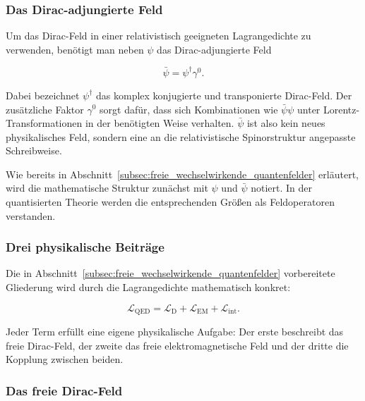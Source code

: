 \subsubsection*{Das Dirac-adjungierte Feld}

Um das Dirac-Feld in einer relativistisch geeigneten Lagrangedichte zu
verwenden, benötigt man neben \(\psi\) das
Dirac-adjungierte Feld

\begin{equation}
	\bar{\psi}
	=
	\psi^\dagger\gamma^0.
	\label{eq:dirac_adjunktion_qed}
\end{equation}

Dabei bezeichnet \(\psi^\dagger\) das komplex konjugierte und
transponierte Dirac-Feld. Der zusätzliche Faktor \(\gamma^0\) sorgt
dafür, dass sich Kombinationen wie \(\bar{\psi}\psi\) unter
Lorentz-Transformationen in der benötigten Weise verhalten.
\(\bar{\psi}\) ist also kein neues physikalisches Feld, sondern eine an
die relativistische Spinorstruktur angepasste Schreibweise.

Wie bereits in Abschnitt~\ref{subsec:freie_wechselwirkende_quantenfelder}
erläutert, wird die mathematische Struktur zunächst mit \(\psi\) und
\(\bar{\psi}\) notiert. In der quantisierten Theorie werden die
entsprechenden Größen als Feldoperatoren verstanden.

\subsubsection*{Drei physikalische Beiträge}

Die in Abschnitt~\ref{subsec:freie_wechselwirkende_quantenfelder}
vorbereitete Gliederung wird durch die Lagrangedichte mathematisch
konkret:

\begin{equation}
	\mathcal L_{\mathrm{QED}}
	=
	\mathcal L_{\mathrm D}
	+
	\mathcal L_{\mathrm{EM}}
	+
	\mathcal L_{\mathrm{int}}.
	\label{eq:zerlegung_lagrangedichte_qed}
\end{equation}

Jeder Term erfüllt eine eigene physikalische Aufgabe: Der erste
beschreibt das freie Dirac-Feld, der zweite das freie elektromagnetische
Feld und der dritte die Kopplung zwischen beiden.

\subsubsection*{Das freie Dirac-Feld}

